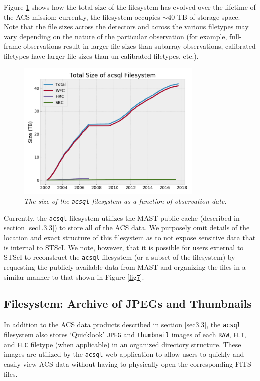 \documentclass[10pt,journal,compsoc]{IEEEtran}
\begin{document}
Figure \ref{fig8} shows how the total size of the filesystem has evolved over the lifetime of the ACS mission; currently, the filesystem occupies $\sim${40} TB of storage space.
Note that the file sizes across the detectors and across the various filetypes may vary depending on the nature of the particular observation (for example, full-frame observations
result in larger file sizes than subarray observations, calibrated filetypes have larger file sizes than un-calibrated filetypes, etc.).

\begin{figure}[!h]
\centering
\includegraphics[width=3.5in]{./figures/filesystem_size.png}
\caption{\textit{The size of the \texttt{acsql} filesystem as a function of observation
date.}}
\label{fig8}
\end{figure}

Currently, the \texttt{acsql} filesystem utilizes the MAST public cache (described in section \ref{sec1.3.3}) to store all of the ACS data.  We purposely omit details of the location
and exact structure of this filesystem as to not expose sensitive data that is internal to STScI.  We note, however, that it is possible for users external to STScI to reconstruct the
\texttt{acsql} filesystem (or a subset of the filesystem) by requesting the publicly-available data from MAST and organizing the files in a similar manner to that shown in Figure \ref{fig7}.


\subsection{Filesystem: Archive of JPEGs and Thumbnails} \label{sec3.4}

In addition to the ACS data products described in section \ref{sec3.3}, the \texttt{acsql} filesystem also stores `Quicklook' \texttt{JPEG} and \texttt{thumbnail} images of each
\texttt{RAW}, \texttt{FLT}, and \texttt{FLC} filetype (when applicable) in an organized directory structure.  These images are utilized by the \texttt{acsql} web application to allow users to
quickly and easily view ACS data without having to physically open the corresponding FITS files.
\end{document}

